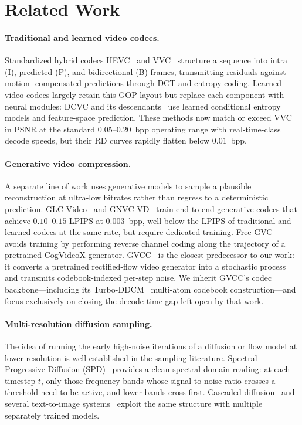 \section{Related Work}
\label{sec:related}

\paragraph{Traditional and learned video codecs.}
Standardized hybrid codecs HEVC~\cite{sullivan2012overview} and
VVC~\cite{bross2021overview} structure a sequence into intra (I), predicted
(P), and bidirectional (B) frames, transmitting residuals against motion-
compensated predictions through DCT and entropy coding. Learned video
codecs largely retain this GOP layout but replace each component with
neural modules: DCVC and its
descendants~\cite{li2024neural,jia2025dcvcrt} use learned conditional
entropy models and feature-space prediction. These methods now match or
exceed VVC in PSNR at the standard 0.05--0.20~bpp operating range with
real-time-class decode speeds, but their RD curves rapidly flatten below
$0.01$~bpp.

\paragraph{Generative video compression.}
A separate line of work uses generative models to sample a plausible
reconstruction at ultra-low bitrates rather than regress to a deterministic
prediction. GLC-Video~\cite{qi2025generative} and
GNVC-VD~\cite{mao2025gnvcvd} train end-to-end generative codecs that
achieve $0.10$--$0.15$ LPIPS at $0.003$~bpp, well below the LPIPS of
traditional and learned codecs at the same rate, but require dedicated
training. Free-GVC~\cite{ling2026freegvc} avoids training by performing
reverse channel coding along the trajectory of a pretrained CogVideoX
generator. GVCC~\cite{zeng2026gvcc} is the closest predecessor to our
work: it converts a pretrained rectified-flow video generator into a
stochastic process and transmits codebook-indexed per-step noise. We
inherit GVCC's codec backbone---including its Turbo-DDCM~\cite{vaisman2025turboddcm}
multi-atom codebook construction---and focus exclusively on closing the
decode-time gap left open by that work.

\paragraph{Multi-resolution diffusion sampling.}
The idea of running the early high-noise iterations of a diffusion or flow
model at lower resolution is well established in the sampling literature.
Spectral Progressive Diffusion (SPD)~\cite{xiao2026spd} provides a clean
spectral-domain reading: at each timestep $t$, only those frequency bands
whose signal-to-noise ratio crosses a threshold need to be active, and
lower bands cross first. Cascaded
diffusion~\cite{ho2022cascaded} and several text-to-image
systems~\cite{podell2023sdxl,esser2024sd3} exploit the same structure with
multiple separately trained models.

